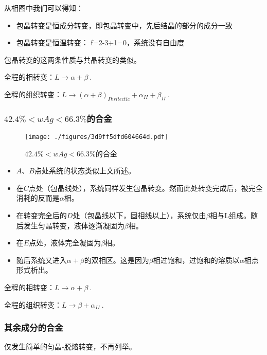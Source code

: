 从相图中我们可以得知：
\begin{itemize}
\item 包晶转变是恒成分转变，即包晶转变中，先后结晶的部分的成分一致
\item 包晶转变是恒温转变： f=2-3+1=0，系统没有自由度
\end{itemize}
包晶转变的这两条性质与共晶转变的类似。

全程的相转变：$L \rightarrow \alpha+\beta~.$

全程的组织转变：$L \rightarrow (\alpha+\beta)_{Peritectic} + \alpha_{II} + \beta_{II}~.$








\subsubsection{$42.4\%<wAg<66.3\%$的合金}
\begin{figure}[ht]
\centering
\texttt{[image: ./figures/3d9ff5dfd604664d.pdf]}
\caption{$42.4\%<wAg<66.3\%$的合金} \label{fig_PERITC_5}
\end{figure}

\begin{itemize}
\item $A$、$B$点处系统的状态类似上文所述。
\item 在$C$点处（包晶线处），系统同样发生包晶转变。然而此处转变完成后，被完全消耗的反而是$\alpha$相。
\item 在转变完全后的$D$处（包晶线以下，固相线以上），系统仅由$\beta$相与L组成。随后发生匀晶转变，液体逐渐凝固为$\beta$相。
\item 在$E$点处，液体完全凝固为$\beta$相。
\item 随后系统又进入$\alpha+\beta$的双相区。这是因为$\beta$相过饱和，过饱和的溶质以$\alpha$相点形式析出。
\end{itemize}

全程的相转变：$L \rightarrow \alpha+\beta~.$

全程的组织转变：$L \rightarrow \beta + \alpha_{II}~.$

\subsubsection{其余成分的合金}
仅发生简单的匀晶-脱熔转变，不再列举。

